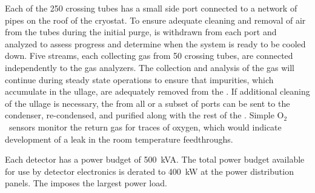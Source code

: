  Each of the 250 crossing tubes has a small side port connected to a network of pipes on the roof of the cryostat. To ensure adequate cleaning and removal of air from the  tubes during the initial  purge,   is withdrawn from each port and analyzed to assess progress and determine when the system is ready to be cooled down.  Five streams, each collecting gas from 50 crossing tubes, are connected independently to the gas analyzers. The collection and analysis of the gas will continue during steady state operations to ensure that impurities, which accumulate in the ullage,  are adequately removed from the .    If additional cleaning of the ullage is necessary, the  from all or a subset of ports can be sent to the condenser, re-condensed, and purified along with the rest of the . Simple O$_2$\ sensors monitor the return gas for traces of oxygen, which would indicate development of  a leak in the room temperature feedthroughs.

Each detector has a power budget of \SI{500}{kVA}. The total power budget available for use by detector electronics is derated to \SI{400}{kW} at the power distribution panels.  The  imposes the largest power load.  

